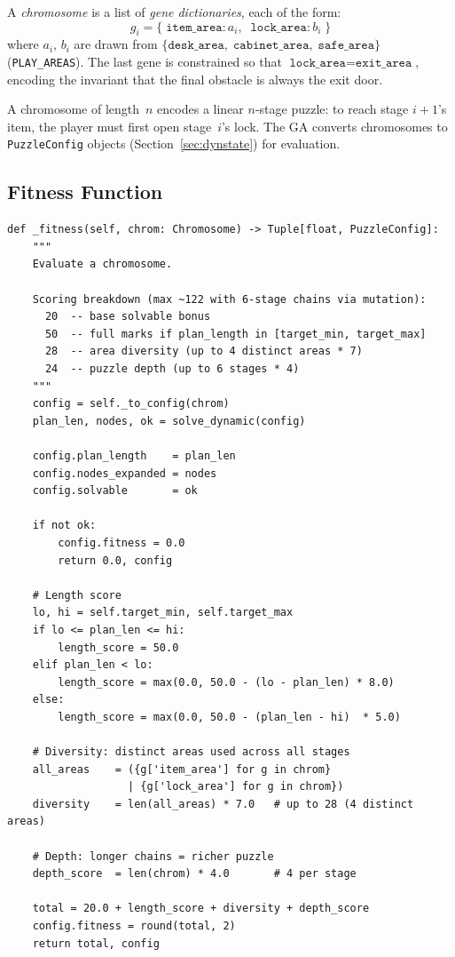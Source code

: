\documentclass[12pt, a4paper]{report}
\begin{document}
A \textit{chromosome} is a list of \textit{gene dictionaries}, each of the
form:
\[
  g_i
  = \{\;\texttt{item\_area}: a_i,\;\; \texttt{lock\_area}: b_i\;\}
\]
where $a_i,\, b_i$ are drawn from
$\{\texttt{desk\_area},\; \texttt{cabinet\_area},\; \texttt{safe\_area}\}$
(\texttt{PLAY\_AREAS}).  The last gene is constrained so that
$\texttt{lock\_area} = \texttt{exit\_area}$, encoding the invariant that the
final obstacle is always the exit door.

A chromosome of length~$n$ encodes a linear $n$-stage puzzle: to reach stage
$i{+}1$'s item, the player must first open stage~$i$'s lock.  The GA converts
chromosomes to \texttt{PuzzleConfig} objects (Section~\ref{sec:dynstate}) for
evaluation.

\subsection{Fitness Function}

\begin{lstlisting}[style=pyStyle,
  caption={GA fitness function (\texttt{ai/genetic.py}).},
  label=lst:gafitness]
def _fitness(self, chrom: Chromosome) -> Tuple[float, PuzzleConfig]:
    """
    Evaluate a chromosome.

    Scoring breakdown (max ~122 with 6-stage chains via mutation):
      20  -- base solvable bonus
      50  -- full marks if plan_length in [target_min, target_max]
      28  -- area diversity (up to 4 distinct areas * 7)
      24  -- puzzle depth (up to 6 stages * 4)
    """
    config = self._to_config(chrom)
    plan_len, nodes, ok = solve_dynamic(config)

    config.plan_length    = plan_len
    config.nodes_expanded = nodes
    config.solvable       = ok

    if not ok:
        config.fitness = 0.0
        return 0.0, config

    # Length score
    lo, hi = self.target_min, self.target_max
    if lo <= plan_len <= hi:
        length_score = 50.0
    elif plan_len < lo:
        length_score = max(0.0, 50.0 - (lo - plan_len) * 8.0)
    else:
        length_score = max(0.0, 50.0 - (plan_len - hi)  * 5.0)

    # Diversity: distinct areas used across all stages
    all_areas    = ({g['item_area'] for g in chrom}
                   | {g['lock_area'] for g in chrom})
    diversity    = len(all_areas) * 7.0   # up to 28 (4 distinct areas)

    # Depth: longer chains = richer puzzle
    depth_score  = len(chrom) * 4.0       # 4 per stage

    total = 20.0 + length_score + diversity + depth_score
    config.fitness = round(total, 2)
    return total, config
\end{lstlisting}
\end{document}
